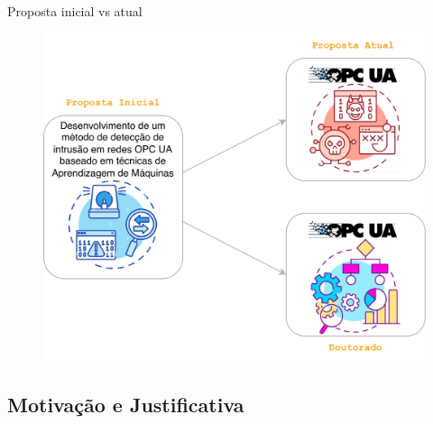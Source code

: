 \documentclass{uspBeamer}
\begin{document}
    \begin{frame}{Proposta inicial vs atual}
        \begin{figure}
            \includegraphics[scale=0.63]{proposta.png}
        \end{figure}
    \end{frame}

    \subsection{Motivação e Justificativa}
\end{document}
